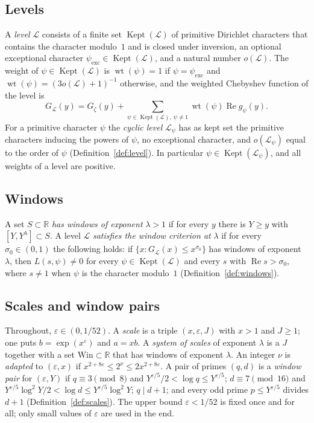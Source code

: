 \documentclass[11pt]{amsbook}
\theoremstyle{plain}
\theoremstyle{definition}
\theoremstyle{remark}
\numberwithin{equation}{section}
\numberwithin{figure}{chapter}
\numberwithin{table}{chapter}
\newcommand{\R}{\mathbb{R}}
\newcommand{\eps}{\varepsilon}
\newcommand{\lev}{\mathscr{L}}
\newcommand{\Gz}{G_{\zeta}}
\newcommand{\Kept}{\operatorname{Kept}}
\newcommand{\wt}{\operatorname{wt}}
\newcommand{\Win}{\mathrm{Win}}
\begin{document}
\subsection*{Levels}

A \emph{level} $\lev$ consists of a finite set $\Kept(\lev)$ of
primitive Dirichlet characters that contains the character modulo~$1$
and is closed under inversion, an optional exceptional character
$\psi_{\mathrm{exc}}\in\Kept(\lev)$, and a natural number $o(\lev)$.
The weight of $\psi\in\Kept(\lev)$ is $\wt(\psi)=1$ if
$\psi=\psi_{\mathrm{exc}}$ and $\wt(\psi)=(3o(\lev)+1)^{-1}$
otherwise, and the weighted Chebyshev function of the level is
\[
G_{\lev}(y)=\Gz(y)+\sum_{\psi\in\Kept(\lev),\ \psi\ne1}
\wt(\psi)\operatorname{Re}g_\psi(y).
\]
For a primitive character $\psi$ the \emph{cyclic level} $\lev_\psi$
has as kept set the primitive characters inducing the powers of
$\psi$, no exceptional character, and $o(\lev_\psi)$ equal to the
order of $\psi$ (Definition~\ref{def:level}). In particular
$\psi\in\Kept(\lev_\psi)$, and all weights of a level are positive.

\subsection*{Windows}

A set $S\subset\R$ \emph{has windows of exponent} $\lambda>1$ if for
every $y$ there is $Y\ge y$ with $[Y,Y^\lambda]\subset S$. A level
$\lev$ \emph{satisfies the window criterion at} $\lambda$ if for
every $\sigma_0\in(0,1)$ the following holds: if
$\{x:G_{\lev}(x)\le x^{\sigma_0}\}$ has windows of exponent
$\lambda$, then $L(s,\psi)\ne0$ for every $\psi\in\Kept(\lev)$ and
every $s$ with $\operatorname{Re}s>\sigma_0$, where $s\ne1$ when
$\psi$ is the character modulo~$1$ (Definition~\ref{def:windows}).

\subsection*{Scales and window pairs}

Throughout, $\eps\in(0,1/52)$. A \emph{scale} is a triple
$(x,\eps,J)$ with $x>1$ and $J\ge1$; one puts $b=\exp(x^\eps)$ and
$a=xb$. A \emph{system of scales} of exponent $\lambda$ is a $J$
together with a set $\Win\subset\R$ that has windows of exponent
$\lambda$. An integer $\nu$ is \emph{adapted} to $(\eps,x)$ if
$x^{2+8\eps}\le2^\nu\le2x^{2+8\eps}$. A pair of primes $(q,d)$ is a
\emph{window pair} for $(\eps,Y)$ if $q\equiv3\pmod8$ and
$Y^{\eps/5}/2<\log q\le Y^{\eps/5}$; $d\equiv7\pmod{16}$ and
$Y^{\eps/5}\log^2Y/2<\log d\le Y^{\eps/5}\log^2Y$; $q\mid d+1$; and
every odd prime $p\le Y^{\eps/5}$ divides $d+1$
(Definition~\ref{def:scales}). The upper bound $\eps<1/52$ is fixed
once and for all; only small values of $\eps$ are used in the end.
\end{document}
